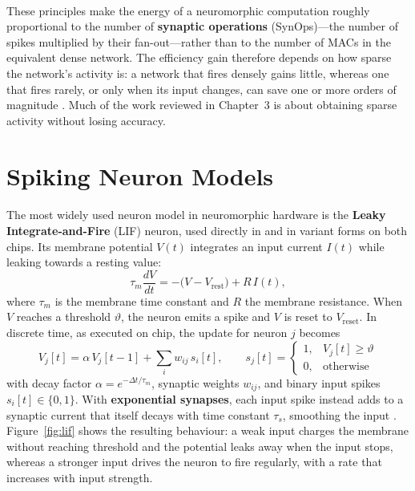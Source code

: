 \documentclass[12pt,a4paper,final]{extreport}
\begin{document}
\paragraph{} These principles make the energy of a neuromorphic computation roughly proportional to the number of \textbf{synaptic operations} (SynOps)---the number of spikes multiplied by their fan-out---rather than to the number of MACs in the equivalent dense network. The efficiency gain therefore depends on how sparse the network's activity is: a network that fires densely gains little, whereas one that fires rarely, or only when its input changes, can save one or more orders of magnitude \cite{p4}. Much of the work reviewed in Chapter~3 is about obtaining sparse activity without losing accuracy.

\section{Spiking Neuron Models}

\paragraph{} The most widely used neuron model in neuromorphic hardware is the \textbf{Leaky Integrate-and-Fire} (LIF) neuron, used directly in \cite{p1} and in variant forms on both chips. Its membrane potential $V(t)$ integrates an input current $I(t)$ while leaking towards a resting value:
\begin{equation}
\tau_m\frac{dV}{dt}=-\big(V-V_{\mathrm{rest}}\big)+R\,I(t),
\end{equation}
where $\tau_m$ is the membrane time constant and $R$ the membrane resistance. When $V$ reaches a threshold $\vartheta$, the neuron emits a spike and $V$ is reset to $V_{\mathrm{reset}}$. In discrete time, as executed on chip, the update for neuron $j$ becomes
\begin{equation}
V_j[t]=\alpha\,V_j[t-1]+\sum_{i}w_{ij}\,s_i[t],\qquad s_j[t]=\begin{cases}1, & V_j[t]\ge\vartheta\\ 0, & \text{otherwise}\end{cases}
\end{equation}
with decay factor $\alpha=e^{-\Delta t/\tau_m}$, synaptic weights $w_{ij}$, and binary input spikes $s_i[t]\in\{0,1\}$. With \textbf{exponential synapses}, each input spike instead adds to a synaptic current that itself decays with time constant $\tau_s$, smoothing the input \cite{p1}. Figure~\ref{fig:lif} shows the resulting behaviour: a weak input charges the membrane without reaching threshold and the potential leaks away when the input stops, whereas a stronger input drives the neuron to fire regularly, with a rate that increases with input strength.
\end{document}
